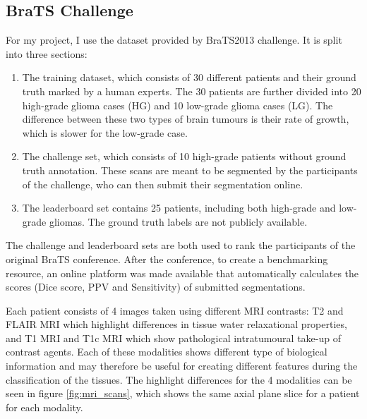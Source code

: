 \documentclass[12pt,a4paper,twoside,openright]{report}
\begin{document}
\subsection{BraTS Challenge}
For my project, I use the dataset provided by BraTS2013\cite{menze:hal-00935640} challenge. It is split into three sections:
\begin{enumerate}
	\item The training dataset, which consists of 30 different patients and their ground truth marked by a human experts. The 30 patients are further divided into 20 high-grade glioma cases (HG) and 10 low-grade glioma cases (LG). The difference between these two types of brain tumours is their rate  of growth, which is slower for the low-grade case.
	\item The challenge set, which consists of 10 high-grade patients without ground truth annotation. These scans are meant to be segmented by the participants of the challenge, who can then submit their segmentation online. 	
	\item The leaderboard set contains 25 patients, including both high-grade and low-grade gliomas. The ground truth labels are not publicly available.
\end{enumerate}
The challenge and leaderboard sets are both used to rank the participants of the original BraTS conference. After the conference, to create a benchmarking resource, an online platform was made available that automatically calculates the scores (Dice score, PPV and Sensitivity) of submitted segmentations.

Each patient consists of 4 images taken using different MRI contrasts: T2 and FLAIR MRI which highlight differences in tissue water relaxational properties, and T1 MRI and T1c MRI which show pathological intratumoural take-up of contrast agents. Each of these modalities shows different type of biological information and may therefore be useful for creating different features during the classification of the tissues. The highlight differences for the 4 modalities can be seen in figure \ref{fig:mri_scans}, which shows the same axial plane slice for a patient for each modality. 
\end{document}
